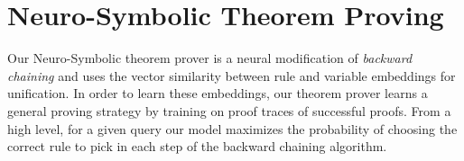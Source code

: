 \section{Neuro-Symbolic Theorem Proving}
\label{sec:softProlog}
Our Neuro-Symbolic theorem prover is a neural modification of \emph{backward chaining} and uses the vector similarity between rule and variable embeddings for unification.
In order to learn these embeddings, our theorem prover learns a general proving strategy by training on proof traces of successful proofs.
From a high level, for a given query our model maximizes the probability of choosing the correct rule to pick in each step of the backward chaining algorithm.
